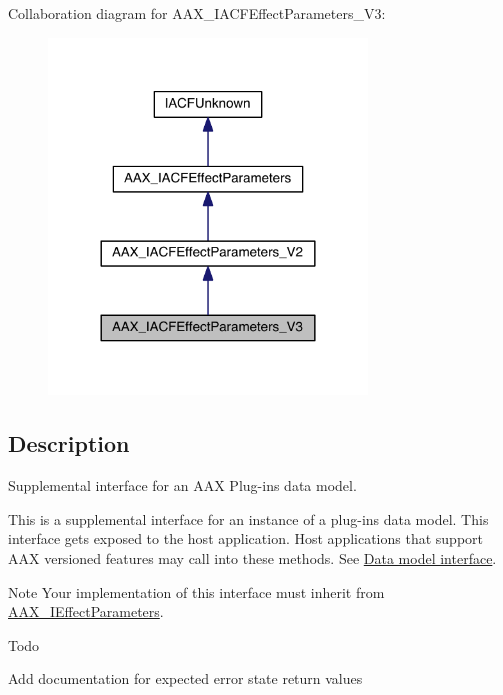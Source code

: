 Collaboration diagram for A\+A\+X\+\_\+\+I\+A\+C\+F\+Effect\+Parameters\+\_\+\+V3\+:
\nopagebreak
\begin{figure}[H]
\begin{center}
\leavevmode
\includegraphics[width=240pt]{a00533}
\end{center}
\end{figure}


\subsection{Description}
Supplemental interface for an A\+A\+X Plug-\/in\textquotesingle{}s data model. 

This is a supplemental interface for an instance of a plug-\/in\textquotesingle{}s data model. This interface gets exposed to the host application. Host applications that support A\+A\+X versioned features may call into these methods. See \hyperlink{a00328}{Data model interface}.

\begin{DoxyNote}{Note}
Your implementation of this interface must inherit from \hyperlink{a00099}{A\+A\+X\+\_\+\+I\+Effect\+Parameters}.
\end{DoxyNote}
\begin{DoxyRefDesc}{Todo}
\item[\hyperlink{a00382__todo000033}{Todo}]Add documentation for expected error state return values\end{DoxyRefDesc}
